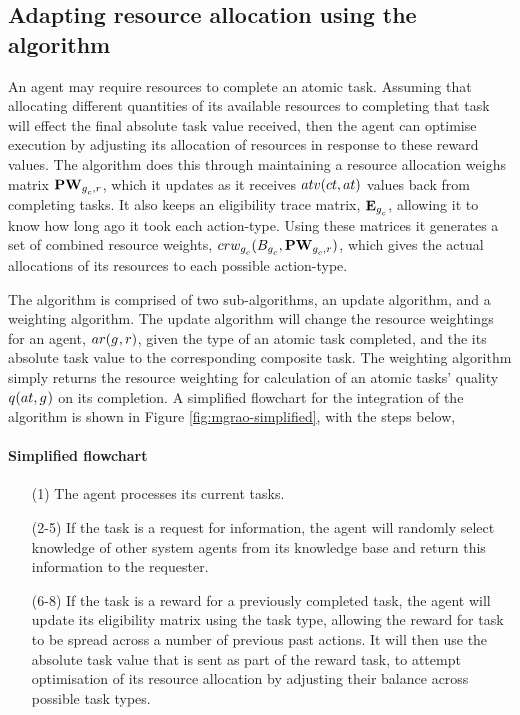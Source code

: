 \subsection{Adapting resource allocation using the \acronymMGRAO{}{} algorithm}

An agent may require resources to complete an atomic task. Assuming that allocating different quantities of its available resources to completing that task will effect the final absolute task value received, then the agent can optimise execution by adjusting its allocation of  resources in response to these reward values. The \acronymMGRAO{}{} algorithm does this through maintaining a resource allocation weighs matrix $\matrixResourceWeight{}{}$, which it updates as it receives $\functionTaskAbsoluteValue{}{}$ values back from completing tasks. It also keeps an eligibility trace matrix, $\matrixEligibilityTrace{}{}$, allowing it to know how long ago it took each action-type. Using these matrices it generates a set of combined resource weights, $\functionCombinedResourceWeightsSignature{}{}$, which gives the actual allocations of its resources to each possible action-type.

The algorithm is comprised of two sub-algorithms, an update algorithm, and a weighting algorithm. The update algorithm will change the resource weightings for an agent, $\functionAgentResources{}{}$, given the type of an atomic task completed, and the its absolute task value to the corresponding composite task. The weighting algorithm simply returns the resource weighting for calculation of an atomic tasks' quality $\functionAtomicTaskQualitySignature{}{}$ on its completion. A simplified flowchart for the integration of the \acronymMGRAO{}{} algorithm is shown in Figure \ref{fig:mgrao-simplified}, with the steps below,

 \paragraph*{Simplified \acronymMGRAO{}{} flowchart}
\begin{enumerate}

	\item[(1)] The agent processes its current tasks. 
	\item[(2-5)] If the task is a request for information, the agent will randomly select knowledge of other system agents from its knowledge base and return this information to the requester. 
	\item[(6-8)] If the task is a reward for a previously completed task, the agent will update its eligibility matrix using the task type, allowing the reward for task to be spread across a number of previous past actions. It will then use the absolute task value that is sent as part of the reward task, to attempt optimisation of its resource allocation by adjusting their balance across possible task types.  
\end{enumerate}

